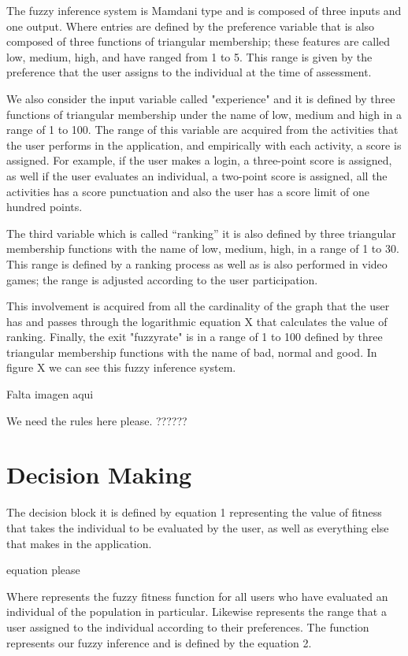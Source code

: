 The fuzzy inference system is Mamdani type and is composed of three inputs and one output. Where entries are defined by the preference variable that is also composed of three functions of triangular membership; these features are called low, medium, high, and have ranged from 1 to 5. This range is given by the preference that the user assigns to the individual at the time of assessment.

We also consider the input variable called "experience" and it is defined by three functions of triangular membership under the name of low, medium and high in a range of 1 to 100. The range of this variable are acquired from the activities that the user performs in the application, and empirically with each activity, a score is assigned. For example, if the user makes a login, a three-point score is assigned, as well if the user evaluates an individual, a two-point score is assigned, all the activities has a score punctuation and also the user has a score limit of one hundred points.

The third variable which is called “ranking” it is also defined by three triangular membership functions with the name of low, medium, high, in a range of 1 to 30. This range is defined by a ranking process as well as is also performed in video games; the range is adjusted according to the user participation.

This involvement is acquired from all the cardinality of the graph that the user has and passes through the logarithmic equation X that calculates the value of ranking. Finally, the exit "fuzzyrate" is in a range of 1 to 100 defined by three triangular membership functions with the name of bad, normal and good. In figure X we can see this fuzzy inference system.

Falta imagen aqui

We need the rules here please. ??????


\section{Decision Making}
The decision block it is defined by equation 1 representing the value of fitness that takes the individual to be evaluated by the user, as well as everything else that makes in the application.

equation please

Where  represents the fuzzy fitness function for all users who have evaluated an individual of the population in particular.
Likewise  represents the range that a user assigned to the individual according to their preferences. The function  represents our fuzzy inference and is defined by the equation 2.


